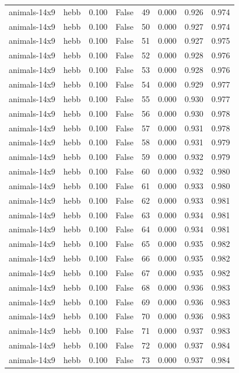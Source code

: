 \begin{tabular}{llrrrrrr}
animals-14x9 & hebb & 0.100 & False & 49 & 0.000 & 0.926 & 0.974 \\
animals-14x9 & hebb & 0.100 & False & 50 & 0.000 & 0.927 & 0.974 \\
animals-14x9 & hebb & 0.100 & False & 51 & 0.000 & 0.927 & 0.975 \\
animals-14x9 & hebb & 0.100 & False & 52 & 0.000 & 0.928 & 0.976 \\
animals-14x9 & hebb & 0.100 & False & 53 & 0.000 & 0.928 & 0.976 \\
animals-14x9 & hebb & 0.100 & False & 54 & 0.000 & 0.929 & 0.977 \\
animals-14x9 & hebb & 0.100 & False & 55 & 0.000 & 0.930 & 0.977 \\
animals-14x9 & hebb & 0.100 & False & 56 & 0.000 & 0.930 & 0.978 \\
animals-14x9 & hebb & 0.100 & False & 57 & 0.000 & 0.931 & 0.978 \\
animals-14x9 & hebb & 0.100 & False & 58 & 0.000 & 0.931 & 0.979 \\
animals-14x9 & hebb & 0.100 & False & 59 & 0.000 & 0.932 & 0.979 \\
animals-14x9 & hebb & 0.100 & False & 60 & 0.000 & 0.932 & 0.980 \\
animals-14x9 & hebb & 0.100 & False & 61 & 0.000 & 0.933 & 0.980 \\
animals-14x9 & hebb & 0.100 & False & 62 & 0.000 & 0.933 & 0.981 \\
animals-14x9 & hebb & 0.100 & False & 63 & 0.000 & 0.934 & 0.981 \\
animals-14x9 & hebb & 0.100 & False & 64 & 0.000 & 0.934 & 0.981 \\
animals-14x9 & hebb & 0.100 & False & 65 & 0.000 & 0.935 & 0.982 \\
animals-14x9 & hebb & 0.100 & False & 66 & 0.000 & 0.935 & 0.982 \\
animals-14x9 & hebb & 0.100 & False & 67 & 0.000 & 0.935 & 0.982 \\
animals-14x9 & hebb & 0.100 & False & 68 & 0.000 & 0.936 & 0.983 \\
animals-14x9 & hebb & 0.100 & False & 69 & 0.000 & 0.936 & 0.983 \\
animals-14x9 & hebb & 0.100 & False & 70 & 0.000 & 0.936 & 0.983 \\
animals-14x9 & hebb & 0.100 & False & 71 & 0.000 & 0.937 & 0.983 \\
animals-14x9 & hebb & 0.100 & False & 72 & 0.000 & 0.937 & 0.984 \\
animals-14x9 & hebb & 0.100 & False & 73 & 0.000 & 0.937 & 0.984 \\

\end{tabular}
